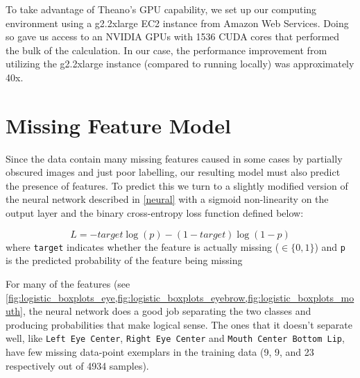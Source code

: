 \documentclass[journal]{IEEEtran}
\begin{document}
To take advantage of Theano's GPU capability, we set up our computing environment using a g2.2xlarge EC2 instance from Amazon Web Services. Doing so gave us access to an NVIDIA GPUs with 1536 CUDA cores that performed the bulk of the calculation. In our case, the performance improvement from utilizing the g2.2xlarge instance (compared to running locally) was approximately 40x.

\section{Missing Feature Model}\label{missing}

Since the data contain many missing features caused in some cases by partially obscured images and just poor labelling, our resulting model must also predict the presence of features.  To predict this we turn to a slightly modified version of the neural network described in \cref{neural} with a sigmoid non-linearity on the output layer and the binary cross-entropy loss function defined below:

\[\label{eq:bin_cross}
 L = -target \log(p) - (1 - target) \log(1 - p)
\]
where \texttt{target} indicates whether the feature is actually missing ($\in \{0,1\}$) and \texttt{p} is the predicted probability of the feature being missing

For many of the features (see \cref{fig:logistic_boxplots_eye,fig:logistic_boxplots_eyebrow,fig:logistic_boxplots_mouth}, the neural network does a good job separating the two classes and producing probabilities that make logical sense.  The ones that it doesn't separate well, like \texttt{Left Eye Center}, \texttt{Right Eye Center} and \texttt{Mouth Center Bottom Lip}, have few missing data-point exemplars in the training data (9, 9, and 23 respectively out of 4934 samples).
\end{document}

